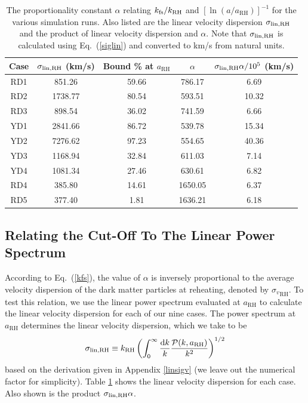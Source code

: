 \documentclass[a4paper,11pt]{article}
\newcommand{\rh}[1]{{#1}_{\mathrm{RH}}}
\newcommand{\kfs}{k_{\rm fs}}
\newcommand{\diff}{\ensuremath{\mathrm{d}}}
\begin{document}
\begin{table}[]
\centering
\begin{tabular}{|c|c|c|c|c|}
\hline
Case & $\sigma_{\rm lin,RH}$ (km/s) & Bound \% at $\rh{a}$ & $\alpha$ & $\sigma_{\rm lin,RH} \alpha/10^5$ (km/s)  \\ \hline \hline
RD1  & 851.26                    & 59.66      & 786.17   & 6.69                      \\ 
RD2  & 1738.77                   & 80.54      & 593.51   & 10.32                     \\ 
RD3  & 898.54                    & 36.02      & 741.59   & 6.66                      \\ 
YD1  & 2841.66                   & 86.72      & 539.78   & 15.34                     \\ 
YD2  & 7276.62                   & 97.23      & 554.65   & 40.36                     \\ 
YD3  & 1168.94                   & 32.84      & 611.03   & 7.14                      \\ 
YD4  & 1081.34                   & 27.46      & 630.61   & 6.82                      \\ 
RD4  & 385.80                    & 14.61      & 1650.05  & 6.37                      \\ 
RD5  & 377.40                    & 1.81       & 1636.21  & 6.18                      \\ \hline
\end{tabular}
\caption{The proportionality constant $\alpha$ relating $\kfs / \rh{k}$ and $[\ln (a/\rh{a})]^{-1}$ for the various simulation runs. Also listed are the linear velocity dispersion $\sigma_{\rm lin,RH }$ and the product of linear velocity dispersion and $\alpha$. Note that $\sigma_{\rm lin,RH }$ is calculated using Eq.~(\ref{siglin}) and converted to km/s from natural units.  }
\label{tab:fitcoeff}
\end{table}

\subsection{Relating the Cut-Off To The Linear Power Spectrum}

According to Eq.~(\ref{kfs}), the value of $\alpha$ is inversely proportional to the average velocity dispersion of the dark matter particles at reheating, denoted by $\rh{\sigma_v}$. To test this relation, we use the linear power spectrum evaluated at $\rh{a}$ to calculate the linear velocity dispersion for each of our nine cases. The power spectrum at $\rh{a}$ determines the linear velocity dispersion, which we take to be \begin{equation} \label{siglin}
    \sigma_{\rm lin,RH}\equiv \rh{k} \left( \int_0^\infty \frac{\diff k}{k} \frac{\mathcal{P}(k,\rh{a})}{k^2}\right)^{1/2}
\end{equation} based on the derivation given in Appendix \ref{linsigv} (we leave out the numerical factor for simplicity). Table \ref{tab:fitcoeff} shows the linear velocity dispersion for each case. Also shown is the product $\sigma_{\rm lin,RH} \alpha$. 
\end{document}
